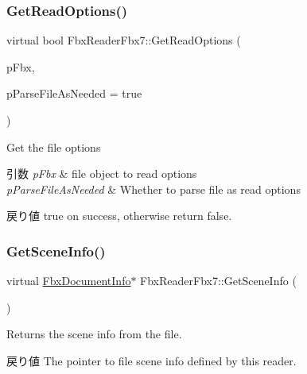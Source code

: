 \mbox{\label{class_fbx_reader_fbx7_a18421554c40bb37447a5cc02ce4b9969}} 
\subsubsection{\texorpdfstring{Get\+Read\+Options()}{GetReadOptions()}\hspace{0.1cm}{\footnotesize\ttfamily [2/2]}}
{\footnotesize\ttfamily virtual bool Fbx\+Reader\+Fbx7\+::\+Get\+Read\+Options (\begin{DoxyParamCaption}\item[{\hyperlink{class_fbx_i_o}{Fbx\+IO} $\ast$}]{p\+Fbx,  }\item[{bool}]{p\+Parse\+File\+As\+Needed = {\ttfamily true} }\end{DoxyParamCaption})\hspace{0.3cm}{\ttfamily [virtual]}}

Get the file options 
\begin{DoxyParams}{引数}
{\em p\+Fbx} & file object to read options \\
\hline
{\em p\+Parse\+File\+As\+Needed} & Whether to parse file as read options \\
\hline
\end{DoxyParams}
\begin{DoxyReturn}{戻り値}
true on success, otherwise return false. 
\end{DoxyReturn}
\mbox{\label{class_fbx_reader_fbx7_a9079add7d3edeb7af9378ae3a19fec35}} 
\subsubsection{\texorpdfstring{Get\+Scene\+Info()}{GetSceneInfo()}}
{\footnotesize\ttfamily virtual \hyperlink{class_fbx_document_info}{Fbx\+Document\+Info}$\ast$ Fbx\+Reader\+Fbx7\+::\+Get\+Scene\+Info (\begin{DoxyParamCaption}{ }\end{DoxyParamCaption})\hspace{0.3cm}{\ttfamily [virtual]}}

Returns the scene info from the file. \begin{DoxyReturn}{戻り値}
The pointer to file scene info defined by this reader. 
\end{DoxyReturn}


